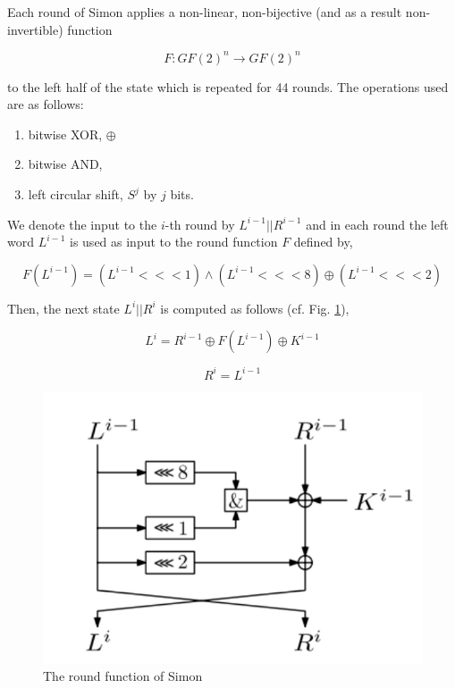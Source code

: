 Each round of Simon applies a non-linear, non-bijective (and as a result
non-invertible) function

\begin{equation}
F:GF(2)^n\rightarrow GF(2)^n
\end{equation}

to the left half of the state which is repeated for 44 rounds.
The operations used are as follows:

\begin{enumerate}
	\item bitwise XOR, $\oplus$
	\item bitwise AND,
	\item left circular shift, $S^j$ by $j$ bits.
\end{enumerate}

We denote the input to the $i$-th round by $L^{i-1}||R^{i-1}$
and in each round the left word $L^{i-1}$ is used as input
to the round function $F$ defined by,

\begin{equation}
F(L^{i-1})=(L^{i-1}<<<1)\wedge(L^{i-1}<<<8)\oplus(L^{i-1}<<<2)
\end{equation}

Then, the next state $L^{i}||R^{i}$ is computed as follows
(cf. Fig. \ref{fig:SIMONroundfn}),

\begin{equation}
L^i=R^{i-1}\oplus F(L^{i-1})\oplus K^{i-1}
\end{equation}

\begin{equation}
R^i=L^{i-1}
\end{equation}


\begin{figure}[!h]
	\vspace{-0.2cm}
	\centering
	\includegraphics[width=120mm]{./pics/SIMONroundfn-eps-converted-to.pdf}
	\caption{The round function of Simon}
	\label{fig:SIMONroundfn}
	\vspace{-0.1cm}
\end{figure}


